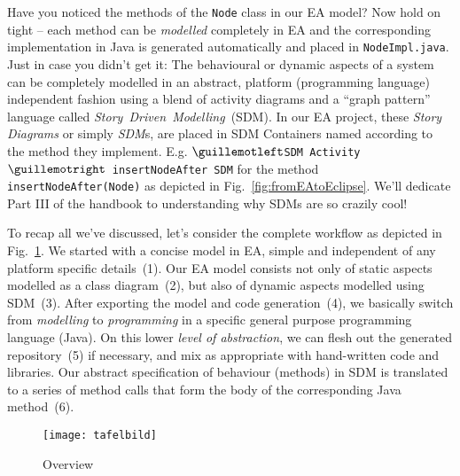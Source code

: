 Have you noticed the methods of the \texttt{Node} class in our EA model?  Now hold on tight -- each method can be \emph{modelled} completely in EA and the
corresponding implementation in Java is generated automatically and placed in \texttt{NodeImpl.java}. Just in case you didn't get it: The behavioural or dynamic
aspects of a system can be completely modelled in an abstract, platform (programming language) independent fashion using a blend of activity  diagrams and a ``graph pattern'' language called \textit{Story~Driven~Modelling}~(SDM). In our EA project, these
\emph{Story Diagrams} or simply \emph{SDM}s, are placed in SDM Containers named according to the method they implement. E.g.  \texttt{$\guillemotleft$SDM
Activity$\guillemotright$ insertNodeAfter SDM} for the method \texttt{insertNodeAft\-er(Node)} as depicted in Fig.~\ref{fig:fromEAtoEclipse}.  We'll dedicate
Part III of the handbook to understanding why SDMs are so  {\huge crazily} cool!

To recap all we've discussed, let's consider the complete workflow as depicted in Fig.~\ref{fig:Overview}. We started with a concise model in EA, simple and
independent of any platform specific details~(1).  Our EA model consists not only of static aspects modelled as a class diagram~(2), but also of dynamic aspects
modelled using SDM~(3).  After exporting the model and code generation~(4), we basically switch from \emph{modelling} to \emph{programming} in a specific
general purpose programming language (Java). On this lower \emph{level of abstraction}, we can flesh out the generated repository~(5) if necessary, and mix as
appropriate with hand-written code and libraries.  Our abstract specification of behaviour (methods) in SDM is translated to a series of method calls that form
the body of the corresponding Java method~(6).


\begin{figure}[htbp]
	\centering
  \texttt{[image: tafelbild]}
	\caption{Overview}
	\label{fig:Overview}
\end{figure}


\clearpage